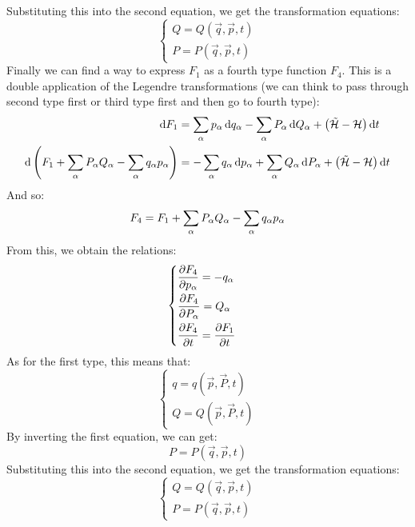 Substituting this into the second equation, we get the transformation equations:
\begin{equation}
    \begin{cases}
        Q = Q(\vec{q},\vec{p},t)\\
        P = P(\vec{q},\vec{p},t)
    \end{cases}
\end{equation}
Finally we can find a way to express $F_1$ as a fourth type function $F_4$. This is a double application of the Legendre transformations (we can think to pass through second type first or third type first and then go to fourth type):
\begin{equation}
    \begin{split}
        \dd{F_1} &= \displaystyle\sum_{\alpha}p_{\alpha}\dd{q_{\alpha}} - \displaystyle\sum_{\alpha}P_{\alpha}\dd{Q_{\alpha}} + \left(\tilde{\mathcal{H}}- \mathcal{H}\right)\dd{t}\\
        \dd{\left(F_1 + \displaystyle\sum_{\alpha}P_{\alpha}Q_{\alpha} - \displaystyle\sum_{\alpha}q_{\alpha}p_{\alpha}\right)} &= -\displaystyle\sum_{\alpha}q_{\alpha}\dd{p_{\alpha}} + \displaystyle\sum_{\alpha}Q_{\alpha}\dd{P_{\alpha}} + \left(\tilde{\mathcal{H}}- \mathcal{H}\right)\dd{t}
    \end{split}
\end{equation}
And so:
\begin{equation}
    F_4 = F_1 + \displaystyle\sum_{\alpha}P_{\alpha}Q_{\alpha} - \displaystyle\sum_{\alpha}q_{\alpha}p_{\alpha}
\end{equation}
From this, we obtain the relations:
\begin{equation}
    \begin{cases}
        \pdv{F_4}{p_{\alpha}} = -q_{\alpha}\\[8pt]
        \pdv{F_4}{P_{\alpha}} = Q_{\alpha}\\[8pt]
        \pdv{F_4}{t} = \pdv{F_1}{t}
    \end{cases}
\end{equation}
As for the first type, this means that:
\begin{equation}
    \begin{cases}
        q = q(\vec{p},\vec{P},t)\\
        Q = Q(\vec{p},\vec{P},t)
    \end{cases}
\end{equation}
By inverting the first equation, we can get:
\begin{equation}
    P = P(\vec{q},\vec{p},t)
\end{equation}
Substituting this into the second equation, we get the transformation equations:
\begin{equation}
    \begin{cases}
        Q = Q(\vec{q},\vec{p},t)\\
        P = P(\vec{q},\vec{p},t)
    \end{cases}
\end{equation}

